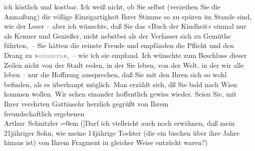 \begin{ledgroupsized}[t]{13cm}
               ich köstlich und kostbar. Ich weiß nicht, ob Sie selbst (verzeihen Sie die Anmaßung)
               die völlige Einzigartigkeit Ihrer Stimme so zu spüren im Stande sind, wie der Leser –
               aber ich wünschte, daß Sie das »Buch der Kindheit« einmal nur als Kenner und
               Genießer, nicht nebstbei als der Verfasser sich zu Gemüthe führten, – Sie hätten die
               reinste Freude und empfänden die Pflicht und den Drang zu
                  »\textcolor{gray}{erinnern}«, – wie ich sie empfand.\pend
           \pstart
           Ich wünschte zum Beschluss dieser Zeilen {\pb}nicht von der Stadt reden,
               in der Sie leben, von der Welt, in der wir alle leben – nur die Hoffnung aussprechen,
               daß Sie mit den Ihren sich so wohl befinden, als es überhaupt möglich. Man erzählt
               sich, dß Sie bald nach Wien kommen wollen. Wir
               sehen einander hoffentlich gewiss wieder.\pend
           \pstart
           Seien Sie, mit Ihrer verehrten Gattinsehr herzlich gegrüßt von Ihrem{\\[\baselineskip]}freundschaftlich ergebenen{\\[\baselineskip]}\spacefill\mbox{Arthur Schnitzler}\pend
           \leftskip=0em{}\pstart
           \noindent{}{[}({]}Darf ich vielleicht auch noch erwähnen, daß mein 21jähriger
                     Sohn, wie meine
                  14jährige Tochter (die ein
                  bischen über ihre Jahre hinaus ist) von Ihrem Fragment in gleicher Weise entzückt waren?) \pend
           
         
         \endnumbering{}\end{ledgroupsized}  \newcommand{\dateiname}{L02404}\newcommand{\titel}{Arthur Schnitzler an Thomas Mann, 18. 11. 1923}\newcommand{\editorInnen}{Martin Anton Müller und Gerd-Hermann Susen}
      